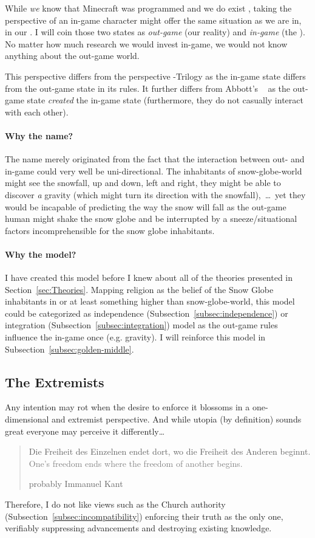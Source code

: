 While \emph{we} know that Minecraft was programmed and we do exist , taking the perspective of an in-game character might offer the same situation as we are in, in our . I will coin those two states as \emph{out-game} (our reality) and \emph{in-game} (the ).
No matter how much research we would invest in-game, we would not know anything about the out-game world.

This perspective differs from the perspective -Trilogy as the in-game state differs from the out-game state in its rules.
It further differs from Abbott's ~\cite{abbott1987flatland} as the out-game state \emph{created} the in-game state (furthermore, they do not casually interact with each other).

\paragraph{Why the name?}
The name  merely originated from the fact that the interaction between out- and in-game could very well be uni-directional.
The inhabitants of snow-globe-world might see the snowfall, up and down, left and right, they might be able to discover \textit{a} gravity (which might turn its direction with the snowfall),~\ldots\ yet they would be incapable of predicting the way the snow will fall as the out-game human might shake the snow globe and be interrupted by a sneeze/situational factors incomprehensible for the snow globe inhabitants.


\paragraph{Why the model?}
I have created this model before I knew about all of the theories presented in Section~\ref{sec:Theories}. Mapping religion as the belief of the Snow Globe inhabitants in  or at least something higher than snow-globe-world, this model could be categorized as independence (Subsection~\ref{subsec:independence}) or integration (Subsection~\ref{subsec:integration}) model as the out-game rules influence the in-game once (e.g. gravity).
I will reinforce this model in Subsection~\ref{subsec:golden-middle}.

\subsection{The Extremists}
Any intention may rot when the desire to enforce it blossoms in a one-dimensional and extremist perspective.
And while utopia (by definition) sounds great everyone may perceive it differently\ldots
\blockquote[probably Immanuel Kant]{Die Freiheit des Einzelnen endet dort, wo die Freiheit des Anderen beginnt.\\\textcolor{gray}{One's freedom ends where the freedom of another begins.}}
Therefore, I do not like views such as the Church authority (Subsection~\ref{subsec:incompatibility}) enforcing their truth as the only one, verifiably suppressing advancements and destroying existing knowledge.

